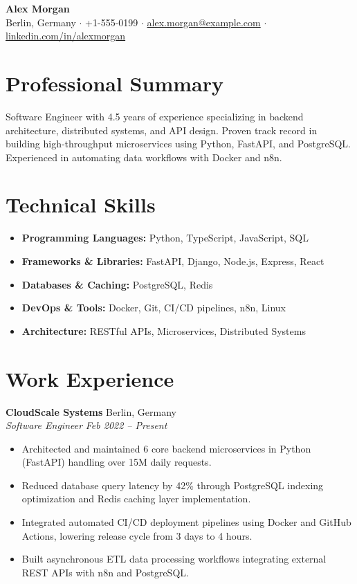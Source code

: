\documentclass[10pt,a4paper]{article}
\begin{document}
\begin{center}
    {\LARGE \textbf{Alex Morgan}} \\ \vspace{4pt}
    Berlin, Germany $\cdot$ +1-555-0199 $\cdot$ \href{mailto:alex.morgan@example.com}{alex.morgan@example.com} $\cdot$ \href{https://linkedin.com/in/alexmorgan}{linkedin.com/in/alexmorgan}
\end{center}

\vspace{6pt}
\section*{Professional Summary}
Software Engineer with 4.5 years of experience specializing in backend architecture, distributed systems, and API design. Proven track record in building high-throughput microservices using Python, FastAPI, and PostgreSQL. Experienced in automating data workflows with Docker and n8n.

\vspace{6pt}
\section*{Technical Skills}
\begin{itemize}[leftmargin=15pt, itemsep=2pt]
    \item \textbf{Programming Languages:} Python, TypeScript, JavaScript, SQL
    \item \textbf{Frameworks \& Libraries:} FastAPI, Django, Node.js, Express, React
    \item \textbf{Databases \& Caching:} PostgreSQL, Redis
    \item \textbf{DevOps \& Tools:} Docker, Git, CI/CD pipelines, n8n, Linux
    \item \textbf{Architecture:} RESTful APIs, Microservices, Distributed Systems
\end{itemize}

\vspace{6pt}
\section*{Work Experience}

\textbf{CloudScale Systems} \hfill Berlin, Germany \\
\textit{Software Engineer} \hfill \textit{Feb 2022 -- Present}
\begin{itemize}[leftmargin=15pt, itemsep=2pt]
    \item Architected and maintained 6 core backend microservices in Python (FastAPI) handling over 15M daily requests.
    \item Reduced database query latency by 42\% through PostgreSQL indexing optimization and Redis caching layer implementation.
    \item Integrated automated CI/CD deployment pipelines using Docker and GitHub Actions, lowering release cycle from 3 days to 4 hours.
    \item Built asynchronous ETL data processing workflows integrating external REST APIs with n8n and PostgreSQL.
\end{itemize}
\end{document}
